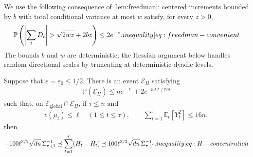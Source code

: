 \documentclass[12pt,cleveref]{jmlr}
\newcommand{\ineqlabel}[1]{\label[inequality]{#1}}
\newcommand{\E}{\mathbb E}
\newcommand{\Pp}{\mathbb P}
\newcommand{\1}{\mathbf 1}
\newcommand{\eps}{\varepsilon}
\begin{document}
We use the following consequence of \cref{lem:freedman}: centered
increments bounded by $b$ with total conditional variance at most $w$
satisfy, for every $z>0$,
\begin{align}
    \Pp\left(\left|\sum_tD_t\right|>\sqrt{2wz}+2bz\right)
    \leq2e^{-z}.
    \ineqlabel{eq:freedman-convenient}
\end{align}
The bounds $b$ and $w$ are deterministic; the Hessian argument below
handles random directional scales by truncating at deterministic
dyadic levels.

\begin{lemma}
    \label{lem:hessian-concentration}
    Suppose that $\eps=\eps_0\leq1/2$. There is an event $\mathcal E_H$
    satisfying
    \begin{align}
        \Pp(\overline{\mathcal E}_H)
        \leq ne^{-\ell}+2e^{-5d\ell/128}
    \end{align}
    such that, on $\mathcal E_{\mathrm{global}}\cap\mathcal E_H$,
    if $\tau\leq n$ and
    \begin{align}
        v(\mu_t)\leq\ell\quad(1\leq t\leq\tau),
        \qquad
        \sum_{t=1}^{\tau}\E_t[Y_t^2]\leq16n,
    \end{align}
    then
    \begin{align}
        -100\ell^{3/2}\sqrt{dn}\,\bar{\Sigma}_{\tau+1}^{-1}
        \preceq\sum_{t=1}^{\tau}(H_t-\bar{H}_t)
        \preceq100\ell^{3/2}\sqrt{dn}\,\bar{\Sigma}_{\tau+1}^{-1}.
        \ineqlabel{eq:H-concentration}
    \end{align}
\end{lemma}
\end{document}
